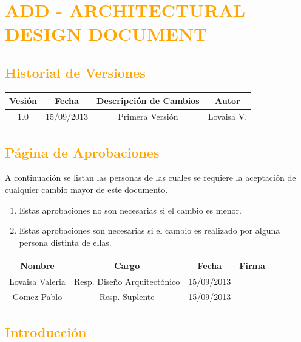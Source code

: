 \chapter{\textcolor{orange}{ADD - ARCHITECTURAL DESIGN DOCUMENT}}
\newpage
\section{\textcolor{orange}{Historial de Versiones}}
\begin{table}[!h]
\begin{center}
\begin{tabular}{|c|c|c|c|}
\hline
\rowcolor[RGB]{255,127,0} Vesión & Fecha & Descripción de Cambios & Autor\\
\hline
1.0 & 15/09/2013 & Primera Versión & Lovaisa V.\\
\hline
\end{tabular}
\end{center}
\end{table}
\newpage

\section{\textcolor{orange}{Página de Aprobaciones}}
A continuación se listan las personas de las cuales se requiere la aceptación de
cualquier cambio mayor de este documento.
\begin{enumerate}
  \item Estas aprobaciones no son necesarias si el cambio es menor.
  \item Estas aprobaciones son necesarias si el cambio es realizado por alguna
  persona distinta de ellas.
\end{enumerate}
\begin{table}[!h]
\begin{center}
\begin{tabular}{|c|c|c|c|}
\hline
\rowcolor[RGB]{255,127,0} Nombre & Cargo & Fecha & Firma\\
\hline
Lovaisa Valeria & Resp. Diseño Arquitectónico & 15/09/2013 & \\
\hline
Gomez Pablo & Resp. Suplente & 15/09/2013 & \\
\hline
\end{tabular}
\end{center}
\end{table}

\newpage
\section{\textcolor{orange}{Introducción}}
